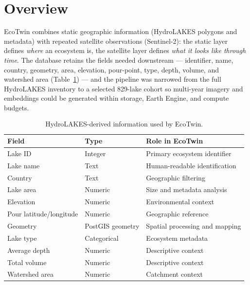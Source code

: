 \documentclass[12pt,a4paper,oneside]{report}
\begin{document}
\section{Overview}

EcoTwin combines static geographic information (HydroLAKES polygons
and metadata) with repeated satellite observations (Sentinel-2): the
static layer defines \emph{where} an ecosystem is, the satellite
layer defines \emph{what it looks like through time}. The database
retains the fields needed downstream --- identifier, name, country,
geometry, area, elevation, pour-point, type, depth, volume, and
watershed area (Table~\ref{tab:hydrolakes_fields}) --- and the
pipeline was narrowed from the full HydroLAKES inventory to a
selected 829-lake cohort so multi-year imagery and embeddings could
be generated within storage, Earth Engine, and compute budgets.

\begin{table}[H]
\centering
\caption{HydroLAKES-derived information used by EcoTwin.}
\label{tab:hydrolakes_fields}
\begin{tabularx}{\textwidth}{l l X}
\toprule
Field & Type & Role in EcoTwin \\
\midrule
Lake ID & Integer & Primary ecosystem identifier \\
Lake name & Text & Human-readable identification \\
Country & Text & Geographic filtering \\
Lake area & Numeric & Size and metadata analysis \\
Elevation & Numeric & Environmental context \\
Pour latitude/longitude & Numeric & Geographic reference \\
Geometry & PostGIS geometry & Spatial processing and mapping \\
Lake type & Categorical & Ecosystem metadata \\
Average depth & Numeric & Descriptive context \\
Total volume & Numeric & Descriptive context \\
Watershed area & Numeric & Catchment context \\
\bottomrule
\end{tabularx}
\end{table}
\end{document}
